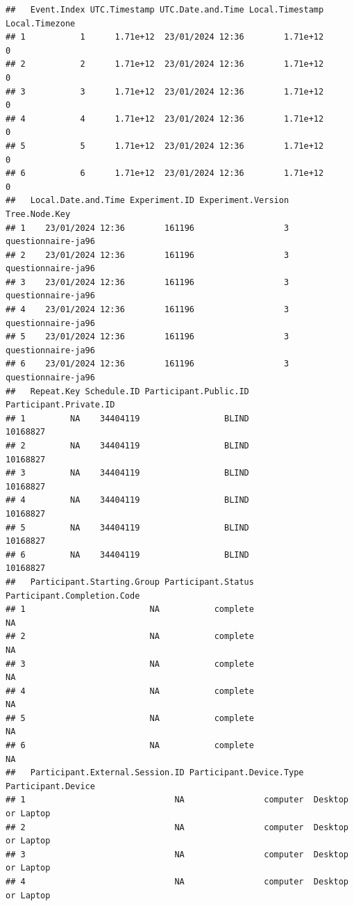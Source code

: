 \documentclass[
]{book}
\begin{document}
\begin{verbatim}
##   Event.Index UTC.Timestamp UTC.Date.and.Time Local.Timestamp Local.Timezone
## 1           1      1.71e+12  23/01/2024 12:36        1.71e+12              0
## 2           2      1.71e+12  23/01/2024 12:36        1.71e+12              0
## 3           3      1.71e+12  23/01/2024 12:36        1.71e+12              0
## 4           4      1.71e+12  23/01/2024 12:36        1.71e+12              0
## 5           5      1.71e+12  23/01/2024 12:36        1.71e+12              0
## 6           6      1.71e+12  23/01/2024 12:36        1.71e+12              0
##   Local.Date.and.Time Experiment.ID Experiment.Version      Tree.Node.Key
## 1    23/01/2024 12:36        161196                  3 questionnaire-ja96
## 2    23/01/2024 12:36        161196                  3 questionnaire-ja96
## 3    23/01/2024 12:36        161196                  3 questionnaire-ja96
## 4    23/01/2024 12:36        161196                  3 questionnaire-ja96
## 5    23/01/2024 12:36        161196                  3 questionnaire-ja96
## 6    23/01/2024 12:36        161196                  3 questionnaire-ja96
##   Repeat.Key Schedule.ID Participant.Public.ID Participant.Private.ID
## 1         NA    34404119                 BLIND               10168827
## 2         NA    34404119                 BLIND               10168827
## 3         NA    34404119                 BLIND               10168827
## 4         NA    34404119                 BLIND               10168827
## 5         NA    34404119                 BLIND               10168827
## 6         NA    34404119                 BLIND               10168827
##   Participant.Starting.Group Participant.Status Participant.Completion.Code
## 1                         NA           complete                          NA
## 2                         NA           complete                          NA
## 3                         NA           complete                          NA
## 4                         NA           complete                          NA
## 5                         NA           complete                          NA
## 6                         NA           complete                          NA
##   Participant.External.Session.ID Participant.Device.Type Participant.Device
## 1                              NA                computer  Desktop or Laptop
## 2                              NA                computer  Desktop or Laptop
## 3                              NA                computer  Desktop or Laptop
## 4                              NA                computer  Desktop or Laptop

\end{verbatim}
\end{document}
